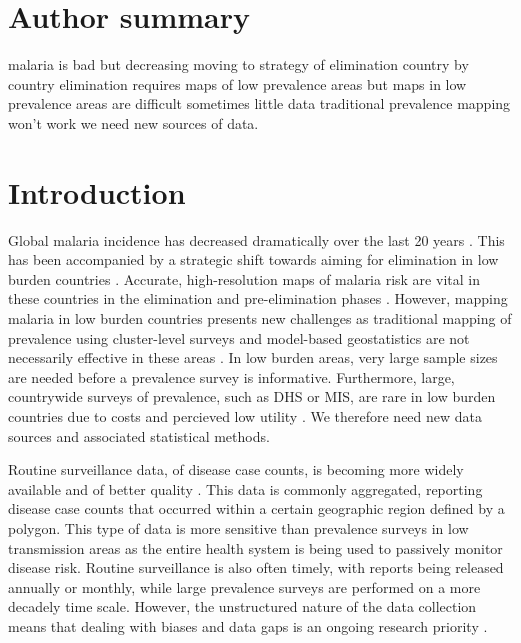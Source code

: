 \documentclass[10pt,letterpaper]{article}
\begin{document}
\section*{Author summary}
malaria is bad but decreasing
moving to strategy of elimination country by country
elimination requires maps of low prevalence areas
but maps in low prevalence areas are difficult
sometimes little data
traditional prevalence mapping won't work
we need new sources of data.


\linenumbers

\section*{Introduction}

Global malaria incidence has decreased dramatically over the last 20 years \cite{abajobir2017global, bhatt2015effect}.
This has been accompanied by a strategic shift towards aiming for elimination in low burden countries \cite{world2016world, newby2016path}.
Accurate, high-resolution maps of malaria risk are vital in these countries in the elimination and pre-elimination phases \cite{sturrock2016mapping, cohen2017mapping}.
However, mapping malaria in low burden countries presents new challenges as traditional mapping of prevalence \cite{gething2011new, bhatt2017improved, gething2012long} using cluster-level surveys and model-based geostatistics are not necessarily effective in these areas \cite {sturrock2016mapping, sturrock2014fine}.
In low burden areas, very large sample sizes are needed before a prevalence survey is informative.
Furthermore, large, countrywide surveys of prevalence, such as DHS or MIS, are rare in low burden countries due to costs and percieved low utility \cite{dhs}.
We therefore need new data sources and associated statistical methods.


Routine surveillance data, of disease case counts, is becoming more widely available and of better quality \cite{sturrock2016mapping, ohrt2015information}.
This data is commonly aggregated, reporting disease case counts that occurred within a certain geographic region defined by a polygon.
This type of data is more sensitive than prevalence surveys in low transmission areas as the entire health system is being used to passively monitor disease risk.
Routine surveillance is also often timely, with reports being released annually or monthly, while large prevalence surveys are performed on a more decadely time scale.
However, the unstructured nature of the data collection means that dealing with biases and data gaps is an ongoing research priority \cite{battle2016treatment, cibulskis2011worldwide}.
\end{document}
